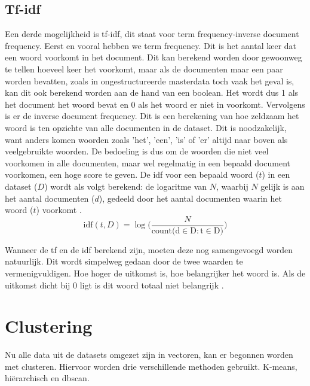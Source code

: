 \subsection{Tf-idf}
Een derde mogelijkheid is tf-idf, dit staat voor term frequency-inverse document frequency. Eerst en vooral hebben we term frequency. Dit is het aantal keer dat een woord voorkomt in het document. Dit kan berekend worden door gewoonweg te tellen hoeveel keer het voorkomt, maar als de documenten maar een paar worden bevatten, zoals in ongestructureerde masterdata toch vaak het geval is, kan dit ook berekend worden aan de hand van een boolean. Het wordt dus 1 als het document het woord bevat en 0 als het woord er niet in voorkomt. Vervolgens is er de inverse document frequency. Dit is een berekening van hoe zeldzaam het woord is ten opzichte van alle documenten in de dataset. Dit is noodzakelijk, want anders komen woorden zoals 'het', 'een', 'is' of 'er' altijd naar boven als veelgebruikte woorden. De bedoeling is dus om de woorden die niet veel voorkomen in alle documenten, maar wel regelmatig in een bepaald document voorkomen, een hoge score te geven. De idf voor een bepaald woord ($t$) in een dataset ($D$) wordt als volgt berekend: de logaritme van $N$, waarbij $N$ gelijk is aan het aantal documenten ($d$), gedeeld door het aantal documenten waarin het woord ($t$) voorkomt \autocite{Simha2021}.
\[\mathrm{idf}(t, D) = \log\bigl( \frac{N}{\mathrm{count(d \in D \colon t \in D}\bigr)})\]


Wanneer de tf en de idf berekend zijn, moeten deze nog samengevoegd worden natuurlijk. Dit wordt simpelweg gedaan door de twee waarden te vermenigvuldigen. Hoe hoger de uitkomst is, hoe belangrijker het woord is. Als de uitkomst dicht bij 0 ligt is dit woord totaal niet belangrijk \autocite{Simha2021}.


\section{Clustering}
Nu alle data uit de datasets omgezet zijn in vectoren, kan er begonnen worden met clusteren. Hiervoor worden drie verschillende methoden gebruikt. K-means, hiërarchisch en dbscan.

